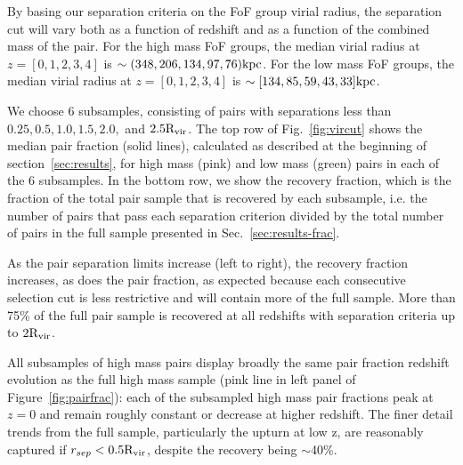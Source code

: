 \documentclass[twocolumn]{aastex631}
\newcommand{\Rvir}{\ensuremath{\rm R_{vir}}}
\begin{document}
    By basing our separation criteria on the FoF group virial radius, the separation cut will vary both as a function of redshift and as a function of the combined mass of the pair.
    For the high mass FoF groups, the median virial radius at $z=[0,1,2,3,4]$ is $\sim(348, 206, 134, 97, 76)\mathrm{kpc}$. 
    For the low mass FoF groups, the median virial radius at $z=[0,1,2,3,4]$ is $\sim[134, 85, 59, 43, 33]\mathrm{kpc}$.    
    
    We choose 6 subsamples, consisting of pairs with separations less than $0.25, 0.5, 1.0, 1.5, 2.0,$ and $2.5\Rvir$. 
    The top row of Fig.~\ref{fig:vircut} shows the median pair fraction (solid lines), calculated as described at the beginning of section~\ref{sec:results}, 
    for high mass (pink) and low mass (green) pairs in each of the 6 subsamples. 
    In the bottom row, we show the recovery fraction, which is the fraction of the total pair sample that is recovered by each subsample, i.e. the number of pairs that pass each separation criterion divided by the total number of pairs in the full sample presented in Sec.~\ref{sec:results-frac}.

    As the pair separation limits increase (left to right), the recovery fraction increases, as does the pair fraction, as expected because each consecutive selection cut is less restrictive and will contain more of the full sample. 
    More than 75\% of the full pair sample is recovered at all redshifts with separation criteria up to $2\Rvir$.

    All subsamples of high mass pairs display broadly the same pair fraction redshift evolution as the full high mass sample (pink line in left panel of Figure~\ref{fig:pairfrac}): each of the subsampled high mass pair fractions peak at $z=0$ and remain roughly constant or decrease at higher redshift. 
    The finer detail trends from the full sample, particularly the upturn at low z, are reasonably captured if $r_{sep} < 0.5 \Rvir$, despite the recovery being $\sim$40\%. 
\end{document}
